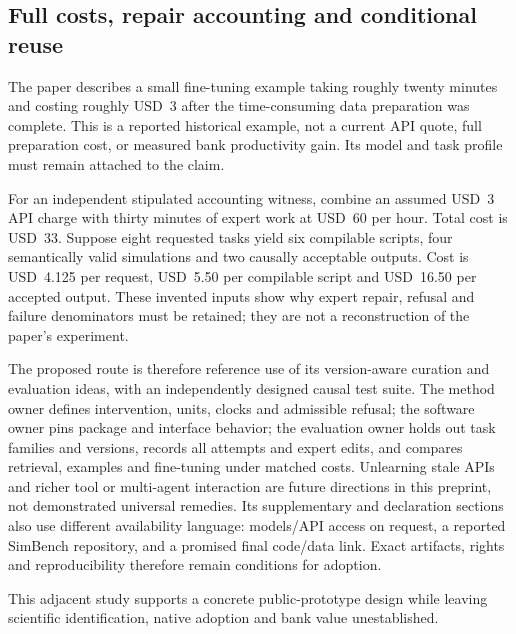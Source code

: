 \subsection{Full costs, repair accounting and conditional reuse}
The paper describes a small fine-tuning example taking roughly twenty minutes
and costing roughly USD~3 after the time-consuming data preparation was
complete. This is a reported historical example, not a current API quote,
full preparation cost, or measured bank productivity gain. Its model and task
profile must remain attached to the claim.\citep{exec24_chronollm_original}

For an independent stipulated accounting witness, combine an assumed USD~3
API charge with thirty minutes of expert work at USD~60 per hour. Total cost
is USD~33. Suppose eight requested tasks yield six compilable scripts, four
semantically valid simulations and two causally acceptable outputs. Cost is
USD~4.125 per request, USD~5.50 per compilable script and USD~16.50 per
accepted output. These invented inputs show why expert repair, refusal and
failure denominators must be retained; they are not a reconstruction of the
paper's experiment.\citep{exec24_chronollm_reference}

The proposed route is therefore reference use of its version-aware curation
and evaluation ideas, with an independently designed causal test suite.
The method owner defines intervention, units, clocks and admissible refusal;
the software owner pins package and interface behavior; the evaluation owner
holds out task families and versions, records all attempts and expert edits,
and compares retrieval, examples and fine-tuning under matched costs.
Unlearning stale APIs and richer tool or multi-agent interaction are future
directions in this preprint, not demonstrated universal remedies. Its
supplementary and declaration sections also use different availability
language: models/API access on request, a reported SimBench repository, and
a promised final code/data link. Exact artifacts, rights and reproducibility
therefore remain conditions for adoption.\citep{exec24_chronollm_original}

This adjacent study supports a concrete public-prototype design while leaving
scientific identification, native adoption and bank value unestablished.

